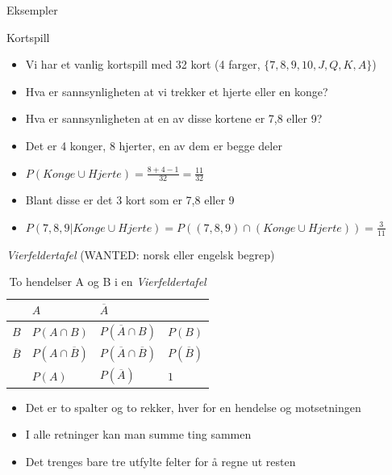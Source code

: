 \begin{frame}{Eksempler}
\begin{block}{Kortspill}
\begin{itemize}
\item Vi har et vanlig kortspill med 32 kort (4 farger, $\{7,8,9,10,J,Q,K,A\}$)
\item Hva er sannsynligheten at vi trekker et hjerte eller en konge?
\item Hva er sannsynligheten at en av disse kortene er 7,8 eller 9?
\item Det er 4 konger, 8 hjerter, en av dem er begge deler
\item $P(Konge\cup Hjerte)=\frac{8+4-1}{32}=\frac{11}{32}$
\item Blant disse er det 3 kort som er 7,8 eller 9
\item $P(7,8,9|Konge\cup Hjerte)=P((7,8,9)\cap(Konge\cup Hjerte))=\frac{3}{11}$
\end{itemize}
\end{block}
\end{frame}

\begin{frame}{\textit{Vierfeldertafel} (WANTED: norsk eller engelsk begrep)}
\begin{table}[h!]
\centering
\label{tab:prob_two_events}
\begin{tabular}{l|ll|l}
\cline{2-3}
                            & $A$            & $\overline{A}$            &                               \\ \hline
\multicolumn{1}{|l|}{$B$}   & $P(A\cap B)$   & $P(\overline{A}\cap B)$   & \multicolumn{1}{l|}{$P(B)$}   \\
\multicolumn{1}{|l|}{$\overline{B}$} & $P(A\cap \overline{B})$ & $P(\overline{A}\cap \overline{B})$ & \multicolumn{1}{l|}{$P(\overline{B})$} \\ \hline
                            & $P(A)$         & $P(\overline{A})$         & \multicolumn{1}{l|}{$1$}      \\ \cline{2-4} 
\end{tabular}
\caption{To hendelser A og B i en \textit{Vierfeldertafel}}
\end{table}
\begin{itemize}
\item Det er to spalter og to rekker, hver for en hendelse og motsetningen
\item I alle retninger kan man summe ting sammen
\item Det trenges bare tre utfylte felter for å regne ut resten
\end{itemize}
\end{frame}

